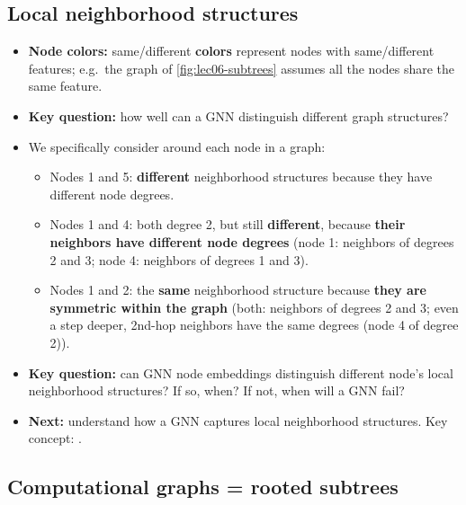\subsection{Local neighborhood structures}\label{sec:lec06-local}

\begin{itemize}
  \item \textbf{Node colors:} same/different \textbf{colors} represent nodes with
    same/different features; e.g.\ the graph of \cref{fig:lec06-subtrees} assumes
    all the nodes share the same feature.
  \item \textbf{Key question:} how well can a GNN distinguish different graph
    structures?
  \item We specifically consider  around each
    node in a graph:
    \begin{itemize}
      \item Nodes 1 and 5: \textbf{different} neighborhood structures because they
        have different node degrees.
      \item Nodes 1 and 4: both degree 2, but still \textbf{different}, because
        \textbf{their neighbors have different node degrees} (node 1: neighbors of
        degrees 2 and 3; node 4: neighbors of degrees 1 and 3).
      \item Nodes 1 and 2: the \textbf{same} neighborhood structure because
        \textbf{they are symmetric within the graph} (both: neighbors of degrees 2
        and 3; even a step deeper, 2nd-hop neighbors have the same degrees (node 4
        of degree 2)).
    \end{itemize}
  \item \textbf{Key question:} can GNN node embeddings distinguish different
    node's local neighborhood structures? If so, when? If not, when will a GNN
    fail?
  \item \textbf{Next:} understand how a GNN captures local neighborhood
    structures. Key concept: .
\end{itemize}

\subsection{Computational graphs = rooted subtrees}\label{sec:lec06-compgraph}

